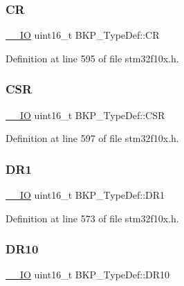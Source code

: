 \subsubsection{\texorpdfstring{CR}{CR}}
{\footnotesize\ttfamily \hyperlink{core__sc300_8h_aec43007d9998a0a0e01faede4133d6be}{\+\_\+\+\_\+\+IO} uint16\+\_\+t B\+K\+P\+\_\+\+Type\+Def\+::\+CR}



Definition at line 595 of file stm32f10x.\+h.

\mbox{\label{struct_b_k_p___type_def_a8edc0ddaac3db876f8d3ddee902bc610}} 
\subsubsection{\texorpdfstring{C\+SR}{CSR}}
{\footnotesize\ttfamily \hyperlink{core__sc300_8h_aec43007d9998a0a0e01faede4133d6be}{\+\_\+\+\_\+\+IO} uint16\+\_\+t B\+K\+P\+\_\+\+Type\+Def\+::\+C\+SR}



Definition at line 597 of file stm32f10x.\+h.

\mbox{\label{struct_b_k_p___type_def_aaa1a907c0aaf85c6de3aa3d829a07a3a}} 
\subsubsection{\texorpdfstring{D\+R1}{DR1}}
{\footnotesize\ttfamily \hyperlink{core__sc300_8h_aec43007d9998a0a0e01faede4133d6be}{\+\_\+\+\_\+\+IO} uint16\+\_\+t B\+K\+P\+\_\+\+Type\+Def\+::\+D\+R1}



Definition at line 573 of file stm32f10x.\+h.

\mbox{\label{struct_b_k_p___type_def_a36060bb3e662e5c2370892caf1a19da6}} 
\subsubsection{\texorpdfstring{D\+R10}{DR10}}
{\footnotesize\ttfamily \hyperlink{core__sc300_8h_aec43007d9998a0a0e01faede4133d6be}{\+\_\+\+\_\+\+IO} uint16\+\_\+t B\+K\+P\+\_\+\+Type\+Def\+::\+D\+R10}



